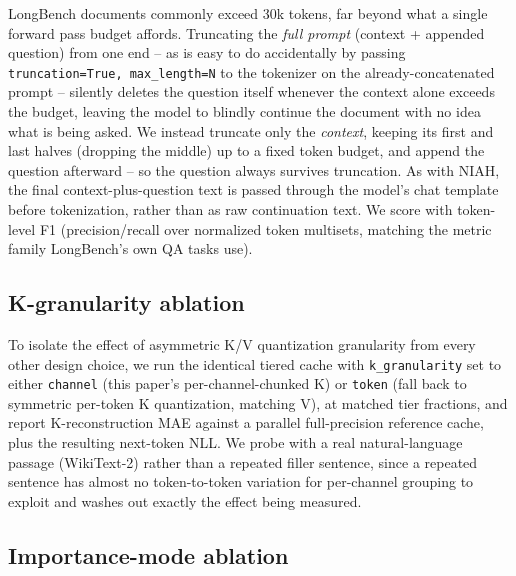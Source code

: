 \documentclass[conference]{IEEEtran}
\begin{document}
LongBench documents commonly exceed 30k tokens, far beyond what a single forward pass
budget affords. Truncating the \emph{full prompt} (context + appended question) from
one end -- as is easy to do accidentally by passing \texttt{truncation=True,
max\_length=N} to the tokenizer on the already-concatenated prompt -- silently deletes
the question itself whenever the context alone exceeds the budget, leaving the model to
blindly continue the document with no idea what is being asked. We instead truncate
only the \emph{context}, keeping its first and last halves (dropping the middle) up to a
fixed token budget, and append the question afterward -- so the question always
survives truncation. As with NIAH, the final context-plus-question text is passed through
the model's chat template before tokenization, rather than as raw continuation text. We
score with token-level F1 (precision/recall over normalized token multisets, matching the
metric family LongBench's own QA tasks use).

\subsection{K-granularity ablation}
\label{sec:kgran}

To isolate the effect of asymmetric K/V quantization granularity from every other
design choice, we run the identical tiered cache with \texttt{k\_granularity} set to
either \texttt{channel} (this paper's per-channel-chunked K) or \texttt{token}
(fall back to symmetric per-token K quantization, matching V), at matched
tier fractions, and report K-reconstruction MAE against a parallel full-precision
reference cache, plus the resulting next-token NLL. We probe with a real natural-language
passage (WikiText-2) rather than a repeated filler sentence, since a repeated sentence
has almost no token-to-token variation for per-channel grouping to exploit and washes
out exactly the effect being measured.

\subsection{Importance-mode ablation}
\label{sec:mode-ablation}
\end{document}
